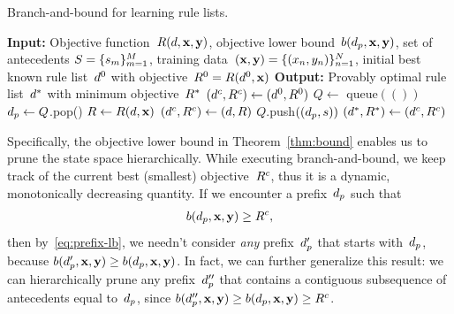 \begin{algorithm}[t!]
\caption{Branch-and-bound for learning rule lists.}
\label{alg:branch-and-bound}
\begin{algorithmic}
\normalsize
\State \textbf{Input:} Objective function~$R({d}, \mathbf{x}, \mathbf{y})$,
objective lower bound~${b(d_p, \mathbf{x}, \mathbf{y})}$,
set of antecedents ${S = \{s_m\}_{m=1}^M}$,
training data~$(\mathbf{x}, \mathbf{y}) = {\{(x_n, y_n)\}_{n=1}^N}$,
initial best known rule list~$d^0$ with objective~${R^0 = R(d^0, \mathbf{x})}$
\State \textbf{Output:} Provably optimal rule list~$d^*$ with minimum objective~$R^*$
\State $(d^c, {R^c}) \gets (d^0, R^0)$ 
\State $Q \gets $ queue$(())$ 
 
	\State $d_p \gets Q$.pop() 
	 
        \State $R \gets R({d}, \mathbf{x})$ 
        \If {$\Obj < \CurrentObj$}
            \State $(d^c, {R^c}) \gets ({d}, R)$ 
        \EndIf
             
                \State $Q$.push$((d_p, s))$ 
            \EndIf
        \EndFor
    \EndIf
\EndWhile
\State $(d^*, R^*) \gets (d^c, {R^c})$ 
\end{algorithmic}
\end{algorithm}

Specifically, the objective lower bound in Theorem~\ref{thm:bound}
enables us to prune the state space hierarchically.
%
While executing branch-and-bound, we keep track of the current best (smallest)
objective~${R^c}$, thus it is a dynamic, monotonically decreasing quantity.
%
If we encounter a prefix~$d_p$ such that
\begin{align}
b(\Prefix, \x, \y) \ge \CurrentObj,
\end{align}
then by~\eqref{eq:prefix-lb}, we needn't consider \emph{any} prefix~$d_p'$
that starts with~$d_p$, because ${b(d_p', \mathbf{x}, \mathbf{y}) \ge b(d_p, \mathbf{x}, \mathbf{y})}$.
%
In fact, we can further generalize this result:
we can hierarchically prune any prefix~$d_p''$ that contains
a contiguous subsequence of antecedents equal to~$d_p$,
since ${b(d_p'', \mathbf{x}, \mathbf{y}) \ge b(d_p, \mathbf{x}, \mathbf{y}) \ge {R^c}}$.

